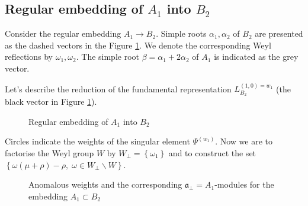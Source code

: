 \documentclass[12pt]{iopart}
\theoremstyle{definition}
\theoremstyle{definition}
\theoremstyle{definition}
\theoremstyle{definition}
\begin{document}
\subsection{Regular embedding of $A_1$ into $B_2$}
\label{sec:regul-embedd-a_1}

Consider the regular embedding $A_1\to B_2$. Simple roots $\alpha_1, \alpha_2$ of $B_2$ are presented as the dashed vectors in the Figure \ref{fig:B2_A1}. We denote the corresponding Weyl reflections by $\omega_1, \omega_2$. The simple root $\beta = \alpha_1+2\alpha_2$ of $A_1$ is indicated as the grey vector.

Let's describe the reduction of the fundamental representation $L^{(1,0)=w_1}_{B_2}$ (the black vector in Figure \ref{fig:B2_A1}).
\begin{figure}[th]
  \noindent{}
  \caption{Regular embedding of $A_1$ into $B_2$}
  \label{fig:B2_A1}
\end{figure}
Circles indicate the weights of the singular element $\Psi^{(w_1)}$.
Now we are to factorise the Weyl group $W$ by $W_{\bot}=\left\{\omega_1\right\}$
and to construct the set $\left\{\omega(\mu+\rho)-\rho,\; \omega\in W_{\bot}\backslash W\right\}$.
\begin{figure}[t]
  \noindent{}
  \caption{Anomalous weights and the corresponding $\mathfrak{a}_{\bot}=A_1$-modules for the embedding $A_1\subset B_2$}
  \label{fig:B2_A1_2}
\end{figure}
\end{document}
